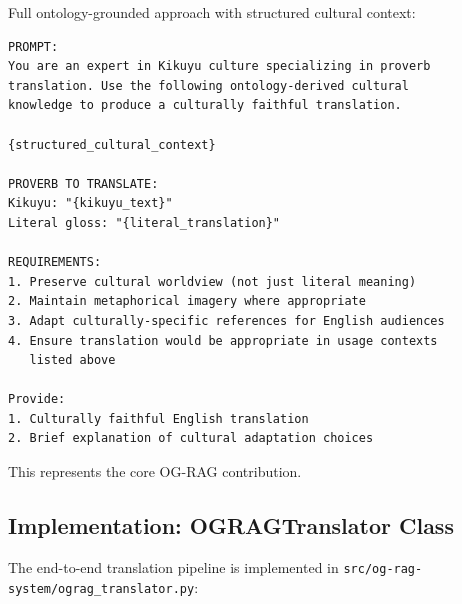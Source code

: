 Full ontology-grounded approach with structured cultural context:

\begin{verbatim}
PROMPT:
You are an expert in Kikuyu culture specializing in proverb
translation. Use the following ontology-derived cultural 
knowledge to produce a culturally faithful translation.

{structured_cultural_context}

PROVERB TO TRANSLATE:
Kikuyu: "{kikuyu_text}"
Literal gloss: "{literal_translation}"

REQUIREMENTS:
1. Preserve cultural worldview (not just literal meaning)
2. Maintain metaphorical imagery where appropriate
3. Adapt culturally-specific references for English audiences
4. Ensure translation would be appropriate in usage contexts
   listed above

Provide:
1. Culturally faithful English translation
2. Brief explanation of cultural adaptation choices
\end{verbatim}

This represents the core OG-RAG contribution.

\subsection{Implementation: OGRAGTranslator Class}
\label{subsec:ograg_translator_impl}

The end-to-end translation pipeline is implemented in \texttt{src/og-rag-system/ograg\_translator.py}:

